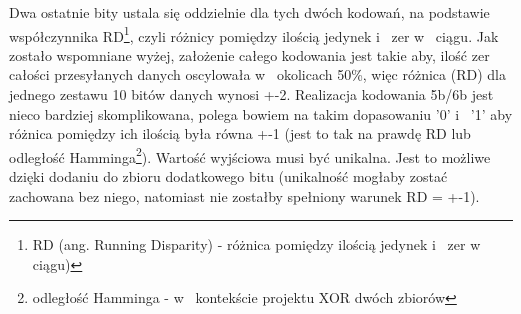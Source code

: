 \documentclass{BscUS}
\begin{document}
Dwa ostatnie bity ustala się oddzielnie dla tych dwóch kodowań, na podstawie współczynnika RD\footnote{RD (ang. Running Disparity) - różnica pomiędzy ilością jedynek i~ zer w~ ciągu)}, czyli różnicy pomiędzy ilością jedynek i~ zer w~ ciągu. Jak zostało wspomniane wyżej, założenie całego kodowania jest takie aby, ilość zer całości przesyłanych danych oscylowała w~ okolicach 50\%, więc różnica (RD) dla jednego zestawu 10 bitów danych wynosi +-2.
\newline
\indent Realizacja kodowania 5b/6b jest nieco bardziej skomplikowana, polega bowiem na takim dopasowaniu '0' i~ '1' aby różnica pomiędzy ich ilością była równa +-1 (jest to tak na prawdę RD lub odległość Hamminga\footnote{odległość Hamminga - w~ kontekście projektu XOR dwóch zbiorów}). Wartość wyjściowa musi być unikalna. Jest to możliwe dzięki dodaniu do zbioru dodatkowego bitu (unikalność mogłaby zostać zachowana bez niego, natomiast nie zostałby spełniony warunek RD = +-1).
\newline
\iffalse 
\end{document}
